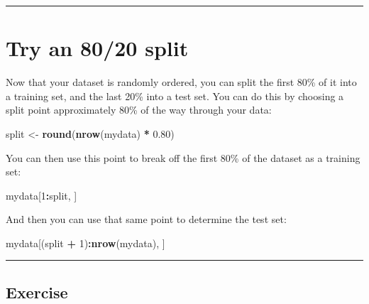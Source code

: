 \documentclass[
]{book}
\newenvironment{Shaded}{\begin{snugshade}}{\end{snugshade}}
\newcommand{\DecValTok}[1]{\textcolor[rgb]{0.00,0.00,0.81}{#1}}
\newcommand{\FloatTok}[1]{\textcolor[rgb]{0.00,0.00,0.81}{#1}}
\newcommand{\KeywordTok}[1]{\textcolor[rgb]{0.13,0.29,0.53}{\textbf{#1}}}
\newcommand{\NormalTok}[1]{#1}
\newcommand{\OperatorTok}[1]{\textcolor[rgb]{0.81,0.36,0.00}{\textbf{#1}}}
\newcommand{\StringTok}[1]{\textcolor[rgb]{0.31,0.60,0.02}{#1}}
\begin{document}
\begin{center}\rule{0.5\linewidth}{0.5pt}\end{center}

\hypertarget{try-an-8020-split}{%
\section{Try an 80/20 split}\label{try-an-8020-split}}

Now that your dataset is randomly ordered, you can split the first 80\% of it into a training set, and the last 20\% into a test set. You can do this by choosing a split point approximately 80\% of the way through your data:

\begin{Shaded}
\begin{Highlighting}[]
\NormalTok{split <-}\StringTok{ }\KeywordTok{round}\NormalTok{(}\KeywordTok{nrow}\NormalTok{(mydata) }\OperatorTok{*}\StringTok{ }\FloatTok{0.80}\NormalTok{)}
\end{Highlighting}
\end{Shaded}

You can then use this point to break off the first 80\% of the dataset as a training set:

\begin{Shaded}
\begin{Highlighting}[]
\NormalTok{mydata[}\DecValTok{1}\OperatorTok{:}\NormalTok{split, ]}
\end{Highlighting}
\end{Shaded}

And then you can use that same point to determine the test set:

\begin{Shaded}
\begin{Highlighting}[]
\NormalTok{mydata[(split }\OperatorTok{+}\StringTok{ }\DecValTok{1}\NormalTok{)}\OperatorTok{:}\KeywordTok{nrow}\NormalTok{(mydata), ]}
\end{Highlighting}
\end{Shaded}

\begin{center}\rule{0.5\linewidth}{0.5pt}\end{center}

\hypertarget{exercise-2}{%
\subsection*{Exercise}\label{exercise-2}}
\end{document}
